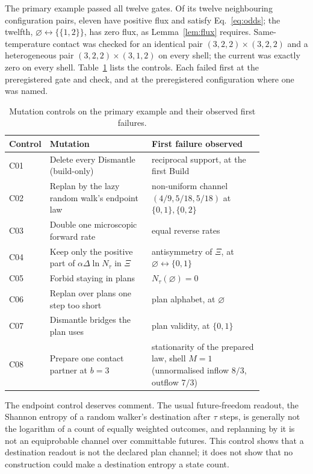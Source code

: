 \documentclass[aps,pre,preprint,superscriptaddress,nofootinbib]{revtex4-2}
\theoremstyle{definition}
\theoremstyle{remark}
\newcommand{\N}{N_\tau}
\begin{document}
The primary example passed all twelve gates. Of its twelve neighbouring configuration pairs, eleven have positive flux and satisfy Eq.~\eqref{eq:odds}; the twelfth, $\varnothing\leftrightarrow\{\{1,2\}\}$, has zero flux, as Lemma~\ref{lem:flux} requires. Same-temperature contact was checked for an identical pair $(3,2,2)\times(3,2,2)$ and a heterogeneous pair $(3,2,2)\times(3,1,2)$ on every shell; the current was exactly zero on every shell. Table~\ref{tab:controls} lists the controls. Each failed first at the preregistered gate and check, and at the preregistered configuration where one was named.

\begin{table}[t]
\caption{Mutation controls on the primary example and their observed first failures.}
\label{tab:controls}
\begin{ruledtabular}
\begin{tabular}{lp{0.40\linewidth}p{0.44\linewidth}}
Control & Mutation & First failure observed\\
\hline
C01 & Delete every Dismantle (build-only) & reciprocal support, at the first Build\\
C02 & Replan by the lazy random walk's endpoint law & non-uniform channel $(4/9,5/18,5/18)$ at $\{0,1\},\{0,2\}$\\
C03 & Double one microscopic forward rate & equal reverse rates\\
C04 & Keep only the positive part of $\alpha\Delta\ln\N$ in $\Xi$ & antisymmetry of $\Xi$, at $\varnothing\leftrightarrow\{0,1\}$\\
C05 & Forbid staying in plans & $\N(\varnothing)=0$\\
C06 & Replan over plans one step too short & plan alphabet, at $\varnothing$\\
C07 & Dismantle bridges the plan uses & plan validity, at $\{0,1\}$\\
C08 & Prepare one contact partner at $b=3$ & stationarity of the prepared law, shell $M=1$ (unnormalised inflow $8/3$, outflow $7/3$)
\end{tabular}
\end{ruledtabular}
\end{table}

The endpoint control deserves comment. The usual future-freedom readout, the Shannon entropy of a random walker's destination after $\tau$ steps, is generally not the logarithm of a count of equally weighted outcomes, and replanning by it is not an equiprobable channel over committable futures. This control shows that a destination readout is not the declared plan channel; it does not show that no construction could make a destination entropy a state count.
\end{document}
